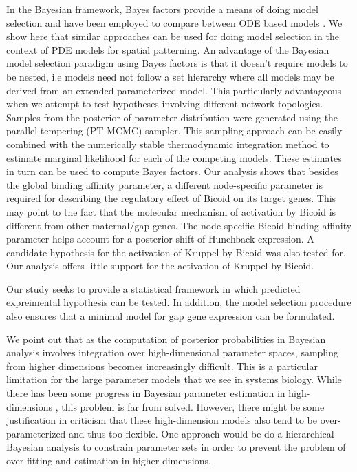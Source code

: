 In the Bayesian framework, Bayes factors provide a means of doing model selection and have been employed to compare between ODE based models \cite{calderhead10, girolami08b, schmidl12, lygeros10}. We show here that similar approaches can be used for doing model selection in the context of PDE models for spatial patterning. An advantage of the Bayesian model selection paradigm using Bayes factors is that it doesn't require models to be nested, i.e models need not follow a set hierarchy where all models may be derived from an extended parameterized model. This particularly advantageous when we attempt to test hypotheses involving different network topologies. Samples from the posterior of parameter distribution were generated using the parallel tempering (PT-MCMC) sampler. This sampling approach can be easily combined with the numerically stable thermodynamic integration method to estimate marginal likelihood for each of the competing models. These estimates in turn can be used to compute Bayes factors. Our analysis shows that besides the global binding affinity parameter, a different node-specific parameter is required for describing the regulatory effect of Bicoid on its target genes. This may point to the fact that the molecular mechanism of activation by Bicoid is different from other maternal/gap genes. The node-specific Bicoid binding affinity parameter helps account for a posterior shift of Hunchback expression. A candidate hypothesis for the activation of Kruppel by Bicoid was also tested for. Our analysis offers little support for the activation of Kruppel by Bicoid. 

Our study seeks to provide a statistical framework in which predicted expreimental hypothesis can be tested. In addition, the model selection procedure also ensures that a minimal model for gap gene expression can be formulated. 

We point out that as the computation of posterior probabilities in Bayesian analysis involves integration over high-dimensional parameter spaces, sampling from higher dimensions becomes increasingly difficult. This is a particular limitation for the large parameter models that we see in systems biology. While there has been some progress in Bayesian parameter estimation in high-dimensions \cite{theis13}, this problem is far from solved. However, there might be some justification in criticism that these high-dimension models also tend to be over-parameterized and thus too flexible. One approach would be do a hierarchical Bayesian analysis \cite{Carlin_Empirical_2000} to constrain parameter sets in order to prevent the problem of over-fitting and estimation in higher dimensions. 